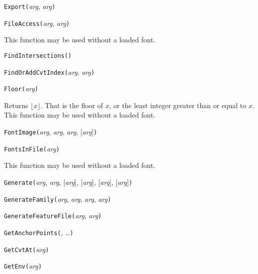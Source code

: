 
\noindent\texttt{Export(}\textit{arg}, \textit{arg}\texttt{)}


\noindent\texttt{FileAccess(}\textit{arg}, \textit{arg}\texttt{)}

This function may be used without a loaded font.


\noindent\texttt{FindIntersections(}\texttt{)}


\noindent\texttt{FindOrAddCvtIndex(}\textit{arg}, \textit{arg}\texttt{)}


\noindent\texttt{Floor(}\textit{arg}\texttt{)}

Returns $\lfloor x \rfloor$.  That is the floor of $x$, or the least
integer greater than or equal to $x$.  This function may be used without a
loaded font.


\noindent\texttt{FontImage(}\textit{arg}, \textit{arg}, \textit{arg}, [\textit{arg}]\texttt{)}


\noindent\texttt{FontsInFile(}\textit{arg}\texttt{)}

This function may be used without a loaded font.


\noindent\texttt{Generate(}\textit{arg}, \textit{arg}, [\textit{arg}], [\textit{arg}], [\textit{arg}], [\textit{arg}]\texttt{)}


\noindent\texttt{GenerateFamily(}\textit{arg}, \textit{arg}, \textit{arg}, \textit{arg}\texttt{)}


\noindent\texttt{GenerateFeatureFile(}\textit{arg}, \textit{arg}\texttt{)}


\noindent\texttt{GetAnchorPoints(}, \ldots\texttt{)}


\noindent\texttt{GetCvtAt(}\textit{arg}\texttt{)}


\noindent\texttt{GetEnv(}\textit{arg}\texttt{)}

